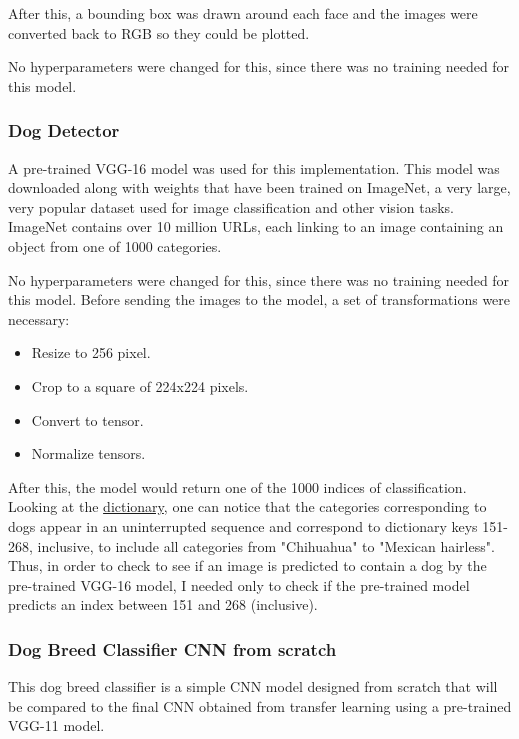 \documentclass{article}
\begin{document}
    After this, a bounding box was drawn around each face and the images were converted back to RGB so they could be plotted.

    No hyperparameters were changed for this, since there was no training needed for this model.
    
    \subsubsection{Dog Detector}
    
    A pre-trained VGG-16 model was used for this implementation. This model was downloaded along with weights that have been trained on ImageNet, a very large, very popular dataset used for image classification and other vision tasks. ImageNet contains over 10 million URLs, each linking to an image containing an object from one of 1000 categories.
    
    No hyperparameters were changed for this, since there was no training needed for this model. Before sending the images to the model, a set of transformations were necessary:

    \begin{itemize}
        \item Resize to 256 pixel.
        \item Crop to a square of 224x224 pixels.
        \item Convert to tensor.
        \item Normalize tensors.
    \end{itemize}

    After this, the model would return one of the 1000 indices of classification. Looking at the \href{https://gist.github.com/yrevar/942d3a0ac09ec9e5eb3a}{dictionary}, one can notice that the categories corresponding to dogs appear in an uninterrupted sequence and correspond to dictionary keys 151-268, inclusive, to include all categories from "Chihuahua" to "Mexican hairless".  Thus, in order to check to see if an image is predicted to contain a dog by the pre-trained VGG-16 model, I needed only to check if the pre-trained model predicts an index between 151 and 268 (inclusive).

    \subsubsection{Dog Breed Classifier CNN from scratch}

    This dog breed classifier is a simple CNN model designed from scratch that will be compared to the final CNN obtained from transfer learning using a pre-trained VGG-11 model.
\end{document}
